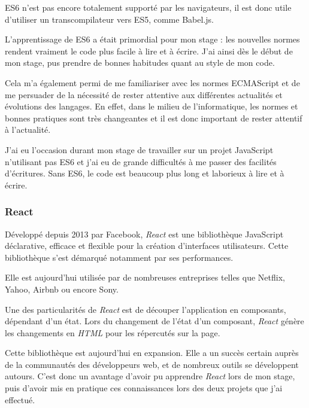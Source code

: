 \documentclass[12pt,a4paper]{article}
\begin{document}
  ES6 n'est pas encore totalement supporté par les navigateurs, il est
  donc utile d'utiliser un transcompilateur vers ES5, comme Babel.js.

  \bigskip

  L'apprentissage de ES6 a était primordial pour mon stage : les nouvelles
  normes rendent vraiment le code plus facile à lire et à écrire. J'ai
  ainsi dès le début de mon stage, pus prendre de bonnes habitudes quant
  au style de mon code.

  \bigskip

  Cela m'a également permi de me familiariser avec les normes ECMAScript
  et de me persuader de la nécessité de rester attentive aux différentes
  actualités et évolutions des langages. En effet, dans le milieu de
  l'informatique, les normes et bonnes pratiques sont très changeantes et
  il est donc important de rester attentif à l'actualité.

  \bigskip

  J'ai eu l'occasion durant mon stage de travailler sur un projet
  JavaScript n'utilisant pas ES6 et j'ai eu de grande difficultés à me
  passer des facilités d'écritures. Sans ES6, le code est beaucoup plus
  long et laborieux à lire et à écrire.

  \bigskip

  \subsubsection{React}\label{react}

  \bigskip

  Développé depuis 2013 par Facebook, \emph{React} est une bibliothèque
  JavaScript déclarative, efficace et flexible pour la création
  d'interfaces utilisateurs. Cette bibliothèque s'est démarqué notamment
  par ses performances.

  \bigskip

  Elle est aujourd'hui utilisée par de nombreuses entreprises telles que
  Netflix, Yahoo, Airbnb ou encore Sony.

  \bigskip

  Une des particularités de \emph{React} est de découper l'application en
  composants, dépendant d'un état. Lors du changement de l'état d'un
  composant, \emph{React} génère les changements en \emph{HTML} pour les
  répercutés sur la page.

  \bigskip

  Cette bibliothèque est aujourd'hui en expansion. Elle a un succès
  certain auprès de la communautés des développeurs web, et de nombreux
  outils se développent autours. C'est donc un avantage d'avoir pu
  apprendre \emph{React} lors de mon stage, puis d'avoir mis en pratique
  ces connaissances lors des deux projets que j'ai effectué.
\end{document}
